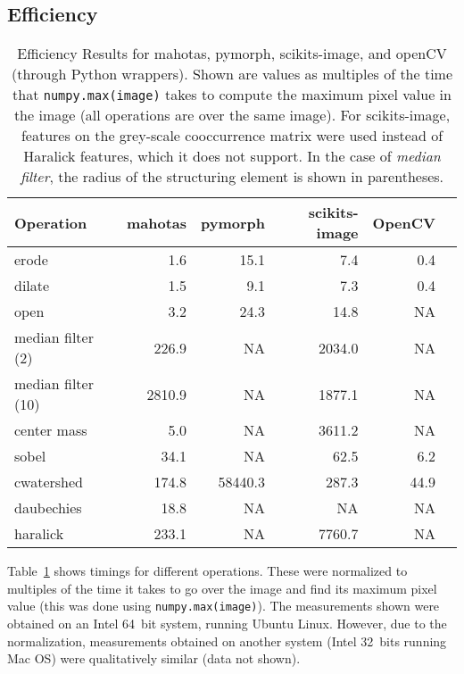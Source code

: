 \documentclass{scrartcl}
\let\code\texttt
\begin{document}
\subsection{Efficiency}

\begin{table}
\centering
\begin{tabular}{lrrrrr}
\toprule
Operation & mahotas & pymorph & scikits-image & OpenCV\\
\midrule
erode                &      1.6 &     15.1 &      7.4 &      0.4 & \\
dilate               &      1.5 &      9.1 &      7.3 &      0.4 & \\
open                 &      3.2 &     24.3 &     14.8 &       NA & \\
median filter (2)    &    226.9 &       NA &   2034.0 &       NA & \\
median filter (10)   &   2810.9 &       NA &   1877.1 &       NA & \\
center mass          &      5.0 &       NA &   3611.2 &       NA & \\
sobel                &     34.1 &       NA &     62.5 &      6.2 & \\
cwatershed           &    174.8 &  58440.3 &    287.3 &     44.9 & \\
daubechies           &     18.8 &       NA &       NA &       NA & \\
haralick             &    233.1 &       NA &   7760.7 &       NA & \\
\bottomrule
\end{tabular}
\caption{Efficiency Results for mahotas, pymorph, scikits-image, and openCV
(through Python wrappers). Shown are values as multiples of the time that
\code{numpy.max(image)} takes to compute the maximum pixel value in the image
(all operations are over the same image). For scikits-image, features on the
grey-scale cooccurrence matrix were used instead of Haralick features, which it
does not support. In the case of \emph{median filter}, the radius of the
structuring element is shown in parentheses.}
\label{tab:efficiency}
\end{table}

Table~\ref{tab:efficiency} shows timings for different operations. These were
normalized to multiples of the time it takes to go over the image and find its
maximum pixel value (this was done using \code{numpy.max(image)}). The
measurements shown were obtained on an Intel 64~bit system, running Ubuntu
Linux. However, due to the normalization, measurements obtained on another
system (Intel 32~bits running Mac OS) were qualitatively similar (data not
shown).
\end{document}
